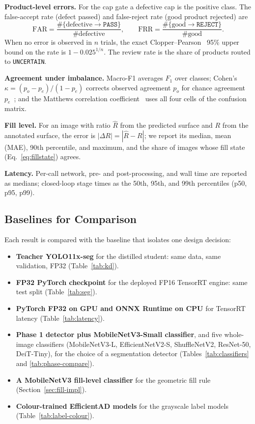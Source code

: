\noindent\textbf{Product-level errors.} For the cap gate a defective cap is the positive class. The false-accept rate (defect passed) and false-reject rate (good product rejected) are
\begin{equation}
    \mathrm{FAR}=\frac{\#\{\text{defective}\rightarrow\texttt{PASS}\}}{\#\text{defective}},\qquad
    \mathrm{FRR}=\frac{\#\{\text{good}\rightarrow\texttt{REJECT}\}}{\#\text{good}}.
    \label{eq:farfrr}
\end{equation}
When no error is observed in $n$ trials, the exact Clopper--Pearson~\cite{clopper1934} 95\% upper bound on the rate is $1-0.025^{1/n}$. The review rate is the share of products routed to \texttt{UNCERTAIN}.

\noindent\textbf{Agreement under imbalance.} Macro-F1 averages $F_1$ over classes; Cohen's $\kappa=(p_o-p_e)/(1-p_e)$ corrects observed agreement $p_o$ for chance agreement $p_e$~\cite{cohen1960}; and the Matthews correlation coefficient~\cite{chicco2020} uses all four cells of the confusion matrix.

\noindent\textbf{Fill level.} For an image with ratio $\hat R$ from the predicted surface and $R$ from the annotated surface, the error is $|\Delta R|=|\hat R-R|$; we report its median, mean (MAE), 90th percentile, and maximum, and the share of images whose fill state (Eq.~\eqref{eq:fillstate}) agrees.

\noindent\textbf{Latency.} Per-call network, pre- and post-processing, and wall time are reported as medians; closed-loop stage times as the 50th, 95th, and 99th percentiles (p50, p95, p99).

\subsection{Baselines for Comparison}
\label{sec:baselines}
Each result is compared with the baseline that isolates one design decision:
\begin{itemize}
    \item \textbf{Teacher YOLO11x-seg} for the distilled student: same data, same validation, FP32 (Table~\ref{tab:kd}).
    \item \textbf{FP32 PyTorch checkpoint} for the deployed FP16 TensorRT engine: same test split (Table~\ref{tab:seg}).
    \item \textbf{PyTorch FP32 on GPU and ONNX Runtime on CPU} for TensorRT latency (Table~\ref{tab:latency}).
    \item \textbf{Phase 1 detector plus MobileNetV3-Small classifier}, and five whole-image classifiers (MobileNetV3-L, EfficientNetV2-S, ShuffleNetV2, ResNet-50, DeiT-Tiny), for the choice of a segmentation detector (Tables~\ref{tab:classifiers} and \ref{tab:phase-compare}).
    \item \textbf{A MobileNetV3 fill-level classifier} for the geometric fill rule (Section~\ref{sec:fill-impl}).
    \item \textbf{Colour-trained EfficientAD models} for the grayscale label models (Table~\ref{tab:label-colour}).
\end{itemize}

